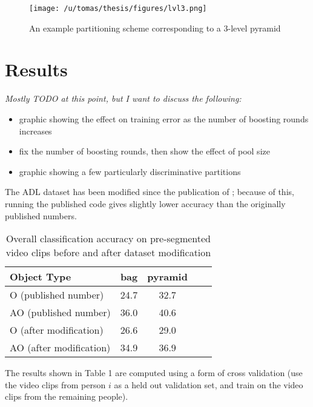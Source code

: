 \documentclass[10pt,twocolumn,letterpaper]{article}
\begin{document}
  \begin{figure}[t]
    \begin{center}
		 \texttt{[image: /u/tomas/thesis/figures/lvl3.png]}
    \end{center}
		   \caption{An example partitioning scheme corresponding to a 3-level
       pyramid}
			\label{fig:long}
			\label{fig:onecol}
  \end{figure}
	
\section{Results}
\textit{Mostly TODO at this point, but I want to discuss the following:}
	\begin{itemize}
		\item graphic showing the effect on training error as the number of
				boosting rounds increases
		\item fix the number of boosting rounds, then show the effect of pool
				size
		\item graphic showing a few particularly discriminative partitions
	\end{itemize}
	The ADL dataset has been modified since the publication of
	\cite{Ramanan12}; because of this, running the published code gives
	slightly lower accuracy than the originally published numbers.

	
	\begin{table}
		\begin{center}
			\begin{tabular}{|l|c|c|c|c|}
				\hline
				Object Type & bag & pyramid  \\
				\hline\hline
				O (published number) & 24.7 & 32.7 \\
			 AO (published number) & 36.0 & 40.6 \\
				\hline\hline
				O (after modification) & 26.6 & 29.0 \\
 				AO (after modification) & 34.9 & 36.9 \\
				\hline
			\end{tabular}
		\end{center}
		\caption{Overall classification accuracy on pre-segmented video clips before and after dataset
		modification}
	\end{table}
	
	The results shown in Table 1 are computed using a form of cross
	validation (use the video clips from person $i$ as a held out validation set, and
	train on the video clips from the remaining people).
	
\end{document}
